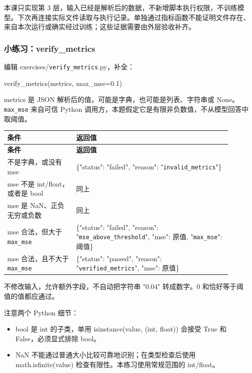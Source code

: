 \documentclass[UTF8,zihao=-4,fontset=fandol]{ctexart}
\begin{document}
本课只实现第 3 层，输入已经是解析后的数据，不新增脚本执行权限，不训练模型。下次再连接实际文件读取与执行记录。单独通过指标函数不能证明文件存在、来自本次运行或确实经过训练；这些证据需要由外层验收补齐。

\subsubsection{小练习：verify\_metrics}

编辑 exercises/\nolinkurl{verify_metrics}.py，补全：

\begin{Code}
verify_metrics(metrics, max_mse=0.1)
\end{Code}

metrics 是 JSON 解析后的值，可能是字典，也可能是列表、字符串或 None。\nolinkurl{max_mse} 来自可信 Python 调用方，本题假定它是有限非负数值，不从模型回答中取阈值。

{\small\setlength{\tabcolsep}{4pt}
\renewcommand{\arraystretch}{1.25}
\begin{longtable}{>{\raggedright\arraybackslash}p{0.28\linewidth}>{\raggedright\arraybackslash}p{0.63\linewidth}}
\toprule
\textbf{条件} & \textbf{返回值} \\
\midrule\endfirsthead
\toprule
\textbf{条件} & \textbf{返回值} \\
\midrule\endhead
\bottomrule\endfoot
不是字典，或没有 mse & \{"status": "failed", "reason": "\nolinkurl{invalid_metrics}"\} \\
mse 不是 int/float，或者是 bool & 同上 \\
mse 是 NaN、正负无穷或负数 & 同上 \\
mse 合法，但大于 \nolinkurl{max_mse} & \{"status": "failed", "reason": "\nolinkurl{mse_above_threshold}", "mse": 原值, "\nolinkurl{max_mse}": 阈值\} \\
mse 合法，且不大于 \nolinkurl{max_mse} & \{"status": "passed", "reason": "\nolinkurl{verified_metrics}", "mse": 原值\} \\
\end{longtable}}

不修改输入，允许额外字段，不自动把字符串 "0.04" 转成数字。0 和恰好等于阈值的值都应通过。

注意两个 Python 细节：

\begin{itemize}
\item bool 是 int 的子类，单用 isinstance(value, (int, float)) 会接受 True 和 False，必须显式排除 bool。
\item NaN 不能通过普通大小比较可靠地识别；在类型检查后使用 math.isfinite(value) 检查有限性。本练习使用常规范围的 int/float。
\end{itemize}
\end{document}
